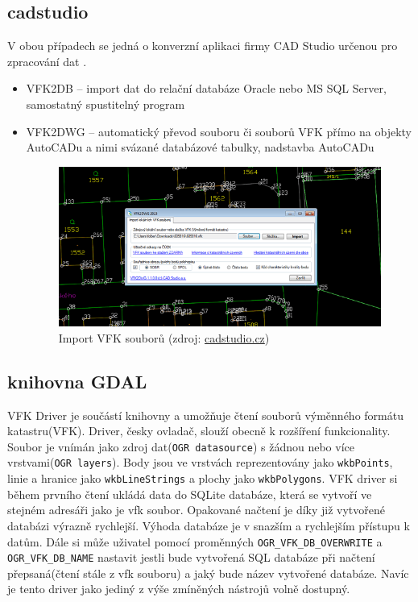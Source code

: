 \subsection{cadstudio}
V obou případech se jedná o konverzní aplikaci firmy CAD Studio určenou pro zpracování dat .
\begin{itemize}
\item VFK2DB -- import dat do relační databáze Oracle nebo MS SQL Server, samostatný spustitelný program \cite{vfk2db} %
\item VFK2DWG -- automatický převod souboru či souborů VFK přímo na objekty AutoCADu a nimi svázané databázové tabulky, nadstavba AutoCADu \cite{vfk2dwg}

\begin{figure}[H]
	 \centering
      \includegraphics[width=14cm]{./pictures/vfk2dwg.png}
      \caption{Import VFK souborů (zdroj:
\href{http://www.cadstudio.cz/img/vfk2dwg11.gif}{cadstudio.cz})}
      \label{fig:iskn studio}
  \end{figure}
\end{itemize}
\subsection{knihovna GDAL} 
VFK Driver je součástí knihovny  a umožňuje čtení souborů výměnného formátu katastru(VFK). Driver, česky ovladač, slouží obecně k rozšíření funkcionality. Soubor  je vnímán jako zdroj dat(\verb|OGR datasource|) s žádnou nebo více vrstvami(\verb|OGR layers|). Body jsou ve vrstvách reprezentovány jako \verb|wkbPoints|, linie a hranice jako \verb|wkbLineStrings| a plochy jako \verb|wkbPolygons|. VFK driver si během prvního čtení ukládá data do SQLite databáze, která se vytvoří ve stejném adresáři jako je vfk soubor. Opakované načtení je díky již vytvořené databázi výrazně rychlejší. Výhoda databáze je v snazším a rychlejším přístupu k datům. Dále si může uživatel pomocí proměnných \verb|OGR_VFK_DB_OVERWRITE| a \verb|OGR_VFK_DB_NAME| nastavit jestli bude vytvořená SQL databáze při načtení přepsaná(čtení stále z vfk souboru) a jaký bude název vytvořené databáze. Navíc je tento driver jako jediný z výše zmíněných nástrojů volně dostupný. \cite{vfk_driver}

